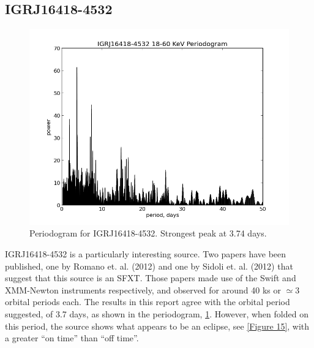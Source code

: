 \clearpage

\subsection{IGRJ16418-4532}

\begin{figure}[h!]
\centering
\includegraphics[width=130mm]{gfx/Fig14.png}
\caption{Periodogram for IGRJ16418-4532. Strongest peak at 3.74 days.}
\label{Figure 14}
\end{figure} 

IGRJ16418-4532 is a particularly interesting source. Two papers have been published, one by Romano et. al. (2012) and one by Sidoli et. al. (2012) that suggest that this source is an SFXT. Those papers made use of the Swift and XMM-Newton instruments respectively, and observed for around 40 ks or $\simeq3$ orbital periods each. The results in this report agree with the orbital period suggested, of 3.7 days, as shown in the periodogram, \ref{Figure 14}. However, when folded on this period, the source shows what appears to be an eclipse, see \ref{Figure 15}, with a greater \textquotedblleft{}on time\textquotedblright{} than \textquotedblleft{}off time\textquotedblright{}. 

